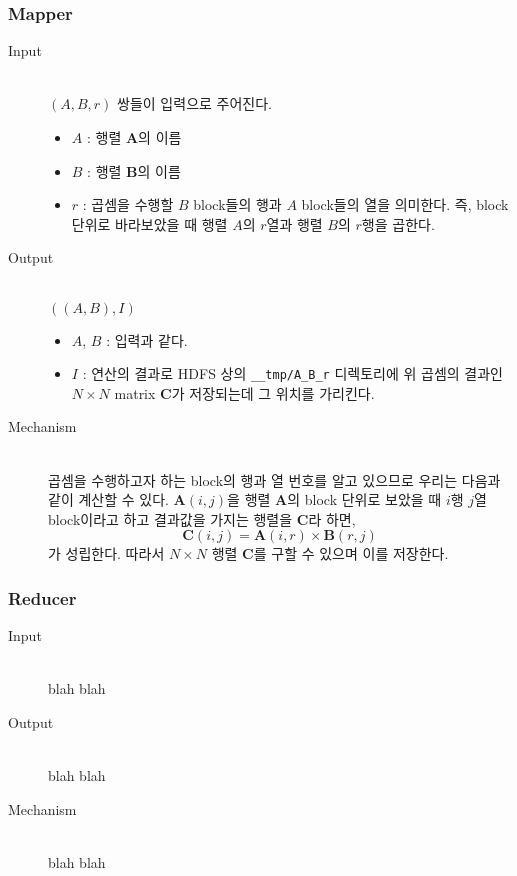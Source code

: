\documentclass[a4paper]{article}
\begin{document}
\begin{multicols}{2}
\subsubsection{Mapper}
\begin{description}
	\item[Input] \hfill \\
	$(A, B, r)$ 쌍들이 입력으로 주어진다.
	\begin{itemize}
		\item $A$ : 행렬 $\mathbf{A}$의 이름
		\item $B$ : 행렬 $\mathbf{B}$의 이름
		\item $r$ : 곱셈을 수행할 $B$ block들의 행과 $A$ block들의 열을 의미한다. 즉, block 단위로 바라보았을 때 행렬 $A$의 $r$열과 행렬 $B$의 $r$행을 곱한다.
	\end{itemize}
	\item[Output] \hfill \\
	$((A, B), I)$
	\begin{itemize}
		\item $A$, $B$ : 입력과 같다.
		\item $I$ : 연산의 결과로 HDFS 상의 \texttt{\_\_tmp/A\_B\_r} 디렉토리에 위 곱셈의 결과인 $N \times N$ matrix $\mathbf{C}$가 저장되는데 그 위치를 가리킨다.
	\end{itemize}
	\item[Mechanism] \hfill \\
	곱셈을 수행하고자 하는 block의 행과 열 번호를 알고 있으므로 우리는 다음과 같이 계산할 수 있다. $\mathbf{A}(i,j)$을 행렬 $\mathbf{A}$의 block 단위로 보았을 때 $i$행 $j$열 block이라고 하고 결과값을 가지는 행렬을 $\mathbf{C}$라 하면,
	\begin{equation*}
		\mathbf{C}(i,j) = \mathbf{A}(i,r) \times \mathbf{B}(r,j)
	\end{equation*}
	가 성립한다. 따라서 $N \times N$ 행렬 $\mathbf{C}$를 구할 수 있으며 이를 저장한다.
\end{description}
\subsubsection{Reducer}
\begin{description}
	\item[Input] \hfill \\
	blah blah
	\item[Output] \hfill \\
	blah blah
	\item[Mechanism] \hfill \\
	blah blah
\end{description}


\end{multicols}
\end{document}
